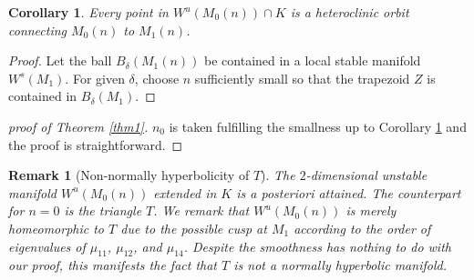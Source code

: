 \documentclass[a4paper,11pt]{article}
\newtheorem{corollary}{Corollary}[section]
\newtheorem{remark}{Remark}[section]
\begin{document}
{\begin{corollary}\label{c:hetero}
 Every point in $W^u(M_0(n))\cap K$ is a heteroclinic orbit connecting $M_0(n)$ to $M_1(n)$.
\end{corollary}
\begin{proof}
  Let the ball $B_\delta(M_1(n))$ be contained in a local stable manifold $W^s(M_1)$. For given $\delta$, choose $n$ sufficiently small so that the trapezoid $Z$ is contained in $B_\delta(M_1)$.
\end{proof}

\begin{proof}[proof of Theorem \ref{thm1}]
 $n_0$ is taken fulfilling the smallness up to Corollary \ref{c:hetero} and the proof is straightforward.
\end{proof}
\begin{remark}[Non-normally hyperbolicity of $T$]
 The $2$-dimensional unstable manifold $W^u(M_0(n))$ extended in $K$ is a posteriori attained. The counterpart for $n=0$ is the triangle $T$. We remark that $W^u(M_0(n))$ is merely homeomorphic to $T$ due to the possible cusp at $M_1$ according to the order of eigenvalues of $\mu_{11}$, $\mu_{12}$, and $\mu_{14}$. Despite the smoothness has nothing to do with our proof, this manifests the fact that $T$ is not a normally hyperbolic manifold. %
\end{remark}



% 

}
\end{document}
